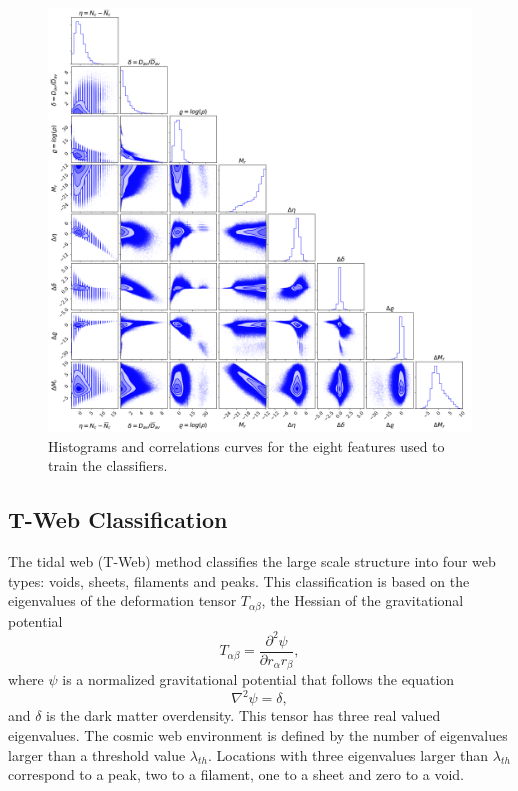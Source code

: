 \documentclass[usenatbib]{mnras}
\begin{document}
\begin{figure}
        \includegraphics[scale=0.3]{Figs/p_all_features_correlations.pdf}
    \caption{Histograms and correlations curves for the eight features used to train the classifiers.}
    \label{fig:features}
\end{figure}

\subsection{T-Web Classification}

The tidal web (T-Web) method \citep{Hahn2007,Forero-Romero2009} classifies the large scale
structure into four web types: voids, sheets, filaments and peaks. 
This classification is based on the eigenvalues of the deformation tensor $T_{\alpha\beta}$, the Hessian of the gravitational potential
\begin{equation}
T_{\alpha\beta}=\frac{\partial^2\psi}{\partial r_{\alpha}r_{\beta}},
\end{equation}
%
where $\psi$ is a normalized gravitational potential that follows the equation
\begin{equation}
    \nabla^2 \psi = \delta,
\end{equation}
%
and $\delta$ is the dark matter overdensity.
This tensor has three real valued eigenvalues. 
The cosmic web environment is defined by the number of eigenvalues larger than
a threshold value $\lambda_{th}$.
Locations with three eigenvalues larger than $\lambda_{th}$ correspond to a peak, two to a filament, one to a sheet and zero to a void.
\end{document}
